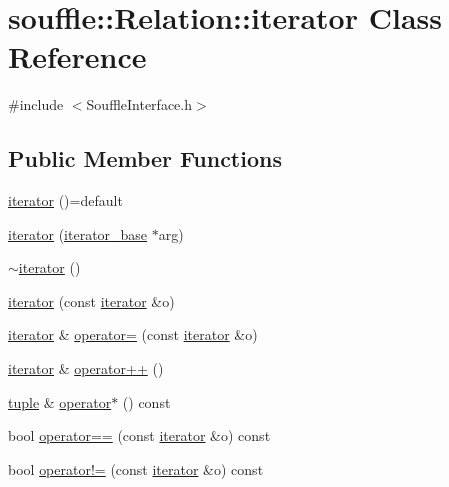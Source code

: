 \hypertarget{classsouffle_1_1_relation_1_1iterator}{}\section{souffle\+:\+:Relation\+:\+:iterator Class Reference}
\label{classsouffle_1_1_relation_1_1iterator}


{\ttfamily \#include $<$Souffle\+Interface.\+h$>$}

\subsection*{Public Member Functions}
\begin{DoxyCompactItemize}
\item 
\hyperlink{classsouffle_1_1_relation_1_1iterator_a8dac8928696b00e063b549675eafd5ed}{iterator} ()=default
\item 
\hyperlink{classsouffle_1_1_relation_1_1iterator_aa285ac4eed6c446a236d6f3cb84bf094}{iterator} (\hyperlink{classsouffle_1_1_relation_1_1iterator__base}{iterator\+\_\+base} $\ast$arg)
\item 
\hyperlink{classsouffle_1_1_relation_1_1iterator_a94498a0b884923e32b2ecbbb31b1fad4}{$\sim$iterator} ()
\item 
\hyperlink{classsouffle_1_1_relation_1_1iterator_a6324ca05414e80ea983220ad01ee9a64}{iterator} (const \hyperlink{classsouffle_1_1_relation_1_1iterator}{iterator} \&o)
\item 
\hyperlink{classsouffle_1_1_relation_1_1iterator}{iterator} \& \hyperlink{classsouffle_1_1_relation_1_1iterator_abf5f84682b367458ef3865e854275cf8}{operator=} (const \hyperlink{classsouffle_1_1_relation_1_1iterator}{iterator} \&o)
\item 
\hyperlink{classsouffle_1_1_relation_1_1iterator}{iterator} \& \hyperlink{classsouffle_1_1_relation_1_1iterator_aecb299b7a3d19a15a3c76e0eb4c90ef0}{operator++} ()
\item 
\hyperlink{classsouffle_1_1tuple}{tuple} \& \hyperlink{classsouffle_1_1_relation_1_1iterator_a64d750911dc77046da33505c0bfcc6a6}{operator$\ast$} () const
\item 
bool \hyperlink{classsouffle_1_1_relation_1_1iterator_a2028555cc6870836362a2cf16b09bbdf}{operator==} (const \hyperlink{classsouffle_1_1_relation_1_1iterator}{iterator} \&o) const
\item 
bool \hyperlink{classsouffle_1_1_relation_1_1iterator_a9605a06c5f3f18025f047ff0c6fcf7a6}{operator!=} (const \hyperlink{classsouffle_1_1_relation_1_1iterator}{iterator} \&o) const
\end{DoxyCompactItemize}

